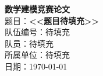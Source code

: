 \thispagestyle{empty}
\begin{center}
    \vspace*{3cm}
    
    {\Huge \textbf{数学建模竞赛论文}}\\[1.5cm]
    
    {\Large 题目：{\color{red}\textbf{<<题目待填充>>}}}\\[0.8cm]
    
    {\large 队伍编号：待填充}\\[0.5cm]
    {\large 队员：待填充}\\[0.5cm]
    {\large 所属单位：待填充}\\[0.5cm]
    {\large 日期：\today}
    
    \vspace{2cm}
    \begin{abstract}
    \end{abstract}
\end{center}
\newpage
